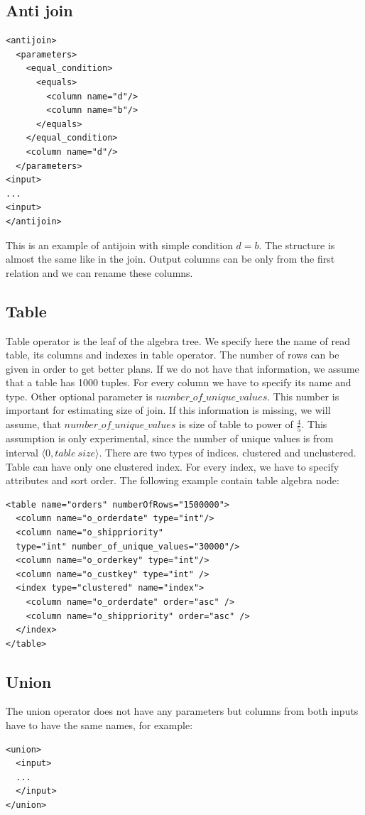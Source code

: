 \subsection{Anti join}

\begin{lstlisting}
<antijoin>
  <parameters>
    <equal_condition>
      <equals>
        <column name="d"/>
        <column name="b"/>
      </equals>
    </equal_condition>
    <column name="d"/>
  </parameters>
<input>
...
<input>
</antijoin>
\end{lstlisting}
This is an example of antijoin with simple condition $d=b$. The structure is almost the same like in the join. Output columns can be only from the first relation and we can rename these columns.

\subsection{Table}
Table operator is the leaf of the algebra tree. We specify here the name of read table, its columns and indexes in table operator. The number of rows can be given in order to get better plans. If we do not have that information, we assume that a table has 1000 tuples. For every column we have to specify its name and type. Other optional parameter is $number\_of\_unique\_values$. This number is important for estimating size of join. If this information is missing, we will assume, that $number\_of\_unique\_values$ is size of table to power of $\frac{4}{5}$. This assumption is only experimental, since the number of unique values is from interval $\langle 0, table~size\rangle$. There are two types of indices. clustered and  unclustered. Table can have only one clustered index. For every index, we have to specify attributes and sort order. The following example contain table algebra node:
 
\begin{lstlisting}
<table name="orders" numberOfRows="1500000">
  <column name="o_orderdate" type="int"/>
  <column name="o_shippriority" 
  type="int" number_of_unique_values="30000"/>
  <column name="o_orderkey" type="int"/>
  <column name="o_custkey" type="int" />
  <index type="clustered" name="index">
    <column name="o_orderdate" order="asc" />
    <column name="o_shippriority" order="asc" />
  </index>
</table>
\end{lstlisting}

\subsection{Union}
The union operator does not have any parameters but columns from both inputs have to have the same names, for example:
\begin{lstlisting}
<union>
  <input>
  ...
  </input>
</union>
\end{lstlisting}

